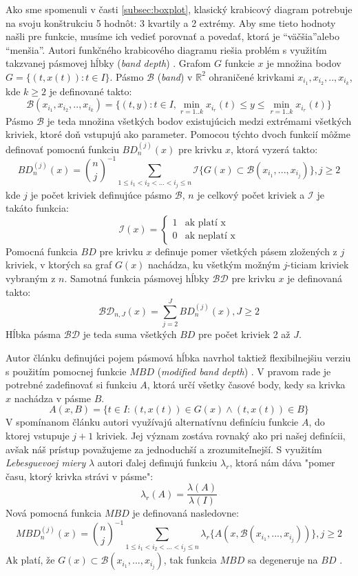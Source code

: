 Ako sme spomenuli v časti \ref{subsec:boxplot}, klasický krabicový diagram potrebuje na svoju konštrukciu 5 hodnôt: 3 kvartily a 2 extrémy. Aby sme tieto hodnoty našli pre funkcie, musíme ich vedieť porovnať a povedať, ktorá je \textquotedblleft väčšia\textquotedblright alebo \textquotedblleft menšia\textquotedblright. Autori funkčného krabicového diagramu riešia problém s využitím takzvanej pásmovej hĺbky (\textit{band depth}) \cite{BandDepth}. Grafom $ G $ funkcie $ x $ je množina bodov $ G = \{ (t,x(t)) : t \in I \} $. Pásmo $ \mathcal{B} $ (\textit{band}) v $ \mathbb{R}^{2}  $ ohraničené krivkami $ x_{i_{1}}, x_{i_{2}}, .. , x_{i_{k}} $, kde $ k \geq 2 $ je definované takto:
\[
	\mathcal{B}(x_{i_{1}}, x_{i_{2}}, .. , x_{i_{k}}) = \{ (t,y) : t \in I, \min_{r=1..k}x_{i_{r}}(t) \leq y \leq \min_{r=1..k}x_{i_{r}}(t) \}
\]
Pásmo $ \mathcal{B} $ je teda množina všetkých bodov existujúcich medzi extrémami všetkých kriviek, ktoré doň vstupujú ako parameter. 
Pomocou týchto dvoch funkcií môžme definovať pomocnú funkciu $ BD_{n}^{(j)}(x) $ pre krivku $ x $, ktorá vyzerá takto:
\[
	BD^{(j)}_{n}(x) = {n \choose j}^{-1} \sum_{1 \leq i_{1} < i_{2} < ... < i_{j} \leq n} \mathcal{I}\{ G(x) \subset \mathcal{B}(x_{i_{1}}, ... ,x_{i_{j}}) \}, j \geq 2
\]
kde $ j $ je počet kriviek definujúce pásmo $ \mathcal{B} $, $ n $ je celkový počet kriviek a $ \mathcal{I} $ je takáto funkcia:
\[
	\mathcal{I}(x) = \left\{
	\begin{array}{ll}
	1 & \mbox{ak platí x}  \\
	0 & \mbox{ak neplatí x} 
	\end{array}
	\right.
\]
Pomocná funkcia $ BD $ pre krivku $ x $ definuje pomer všetkých pásem zložených z $ j $ kriviek, v ktorých sa graf $ G(x) $ nachádza, ku všetkým možným $ j $-ticiam kriviek vybraným z $ n $. 
Samotná funkcia pásmovej hĺbky $ \mathcal{BD} $ pre krivku $ x $ je definovaná takto:
\[
	\mathcal{BD}_{n, J}(x) = \sum_{j = 2}^{J} BD^{(j)}_{n}(x), J \geq 2
\]
Hĺbka pásma $ \mathcal{BD} $ je teda suma všetkých $ BD $ pre počet kriviek 2 až $ J $.

Autor článku definujúci pojem pásmová hĺbka navrhol taktiež flexibilnejšiu verziu s použitím pomocnej funkcie $ MBD $ (\textit{modified band depth}) \cite{BandDepth}. V pravom rade je potrebné zadefinovať si funkciu $ A $, ktorá určí všetky časové body, kedy sa krivka $ x $ nachádza v pásme $ B $.
\[
	A(x, B) = \{ t \in I : (t, x(t)) \in G(x) \wedge (t, x(t)) \in B \}
\]
V spomínanom článku autori využívajú alternatívnu definíciu funkcie $ A $, do ktorej vstupuje $ j + 1 $ kriviek. Jej význam zostáva rovnaký ako pri našej definícii, avšak náš prístup považujeme za jednoduchší a zrozumiteľnejší. S využitím \textit{Lebesguevoej miery} $ \lambda $ autori ďalej definujú funkciu $ \lambda_{r} $, ktorá nám dáva "pomer času, ktorý krivka strávi v pásme":
\[
	\lambda_{r}(A) = \dfrac{\lambda(A)}{\lambda(I)} 
\]
Nová pomocná funkcia $ MBD $ je definovaná nasledovne:
\[
	MBD^{(j)}_{n}(x) = {n \choose j}^{-1} \sum_{1 \leq i_{1} < i_{2} < ... < i_{j} \leq n} \lambda_{r}\{ A(x, \mathcal{B}(x_{i_{1}}, ... ,x_{i_{j}})) \}, j \geq 2
\]
Ak platí, že $ G(x) \subset \mathcal{B}(x_{i_{1}}, ... ,x_{i_{j}}) $, tak funkcia $ MBD $ sa degeneruje na $ BD $ \cite{FunctionalBoxplot}.

